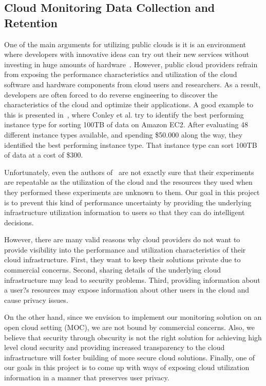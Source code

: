 \subsection{Cloud Monitoring Data Collection and Retention}

One of the main arguments for utilizing public clouds is it is an environment where developers with innovative ideas can try out their new services without investing in huge amounts of hardware~\cite{Armbrust2009}. However, public cloud providers refrain from exposing the performance characteristics and utilization of the cloud software and hardware components from cloud users and researchers. As a result, developers are often forced to do reverse engineering to discover the characteristics of the cloud and optimize their applications. A good example to this is presented in~\cite{???}, where Conley et al. try to identify the best performing instance type for sorting 100TB of data on Amazon EC2. After evaluating 48 different instance types available, and spending \$50.000 along the way, they identified the best performing instance type. That instance type can sort 100TB of data at a cost of \$300. 

Unfortunately, even the authors of~\cite{???} are not exactly sure that their experiments are repeatable as the utilization of the cloud and the resources they used when they performed these experiments are unknown to them. Our goal in this project is to prevent this kind of performance uncertainty by providing the underlying infrastructure utilization information to users so that they can do intelligent decisions.          

However, there are many valid reasons why cloud providers do not want to provide visibility into the performance and utilization characteristics of their cloud infrastructure. First, they want to keep their solutions private due to commercial concerns. Second, sharing details of the underlying cloud infrastructure may lead to security problems. Third, providing information about a user?s resources may expose information about other users in the cloud and cause privacy issues. 

On the other hand, since we envision to implement our monitoring solution on an open cloud setting (MOC), we are not bound by commercial concerns. Also, we believe that security through obscurity is not the right solution for achieving high level cloud security and providing increased transparency to the cloud infrastructure will foster building of more secure cloud solutions. Finally, one of our goals in this project is to come up with ways of exposing cloud utilization information in a manner that preserves user privacy.  

